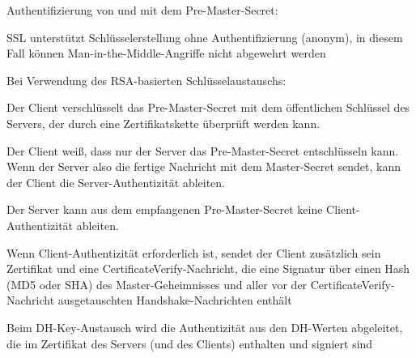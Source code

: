 \documentclass[a4paper]{article}
\begin{document}
\begin{multicols}{3}
\begin{itemize*}
\begin{itemize*}
\begin{itemize*}
                  \end{itemize*}
                  \item Authentifizierung von und mit dem Pre-Master-Secret:
                  \begin{itemize*}
                        \item SSL unterstützt Schlüsselerstellung ohne Authentifizierung (anonym), in diesem Fall können Man-in-the-Middle-Angriffe nicht abgewehrt werden
                        \item Bei Verwendung des RSA-basierten Schlüsselaustauschs:
                        \begin{itemize*} \item Der Client verschlüsselt das Pre-Master-Secret mit dem öffentlichen Schlüssel des Servers, der durch eine Zertifikatskette überprüft werden kann. \item Der Client weiß, dass nur der Server das Pre-Master-Secret entschlüsseln kann. Wenn der Server also die fertige Nachricht mit dem Master-Secret sendet, kann der Client die Server-Authentizität ableiten. \item Der Server kann aus dem empfangenen Pre-Master-Secret keine Client-Authentizität ableiten. \item Wenn Client-Authentizität erforderlich ist, sendet der Client zusätzlich sein Zertifikat und eine CertificateVerify-Nachricht, die eine Signatur über einen Hash (MD5 oder SHA) des Master-Geheimnisses und aller vor der CertificateVerify-Nachricht ausgetauschten Handshake-Nachrichten enthält \end{itemize*}
                        \item Beim DH-Key-Austausch wird die Authentizität aus den DH-Werten abgeleitet, die im Zertifikat des Servers (und des Clients) enthalten und signiert sind
                  \end{itemize*}
            \end{itemize*}


\end{itemize*}
\end{multicols}
\end{document}
